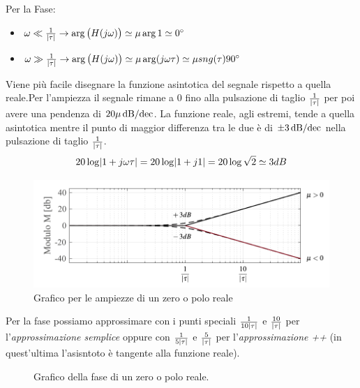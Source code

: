 Per la Fase:
\begin{itemize}
	\item $ \omega \ll \frac{1}{\abs{\tau}} \rightarrow \arg \big(H(j\omega)\big) \simeq \mu \arg 1 \simeq \ang{0} $ 
	\item $ \omega \gg \frac{1}{\abs{\tau}} \rightarrow \arg \big(H(j\omega)\big) \simeq \mu \arg (j\omega\tau) \simeq \mu \sng(\tau)\ang{90} $ 
\end{itemize}

Viene più facile disegnare la funzione asintotica del segnale rispetto a quella reale.Per l'ampiezza il segnale rimane a $ 0 $ fino alla pulsazione di taglio $ \frac{1}{\abs{\tau}} $ per poi avere una pendenza di $ 20 \mu \dbdec $. La funzione reale, agli estremi, tende a quella asintotica mentre il punto di maggior differenza tra le due è di $ \pm 3 \dbdec $ nella pulsazione di taglio $ \frac{1}{\abs{\tau}} $.
\[ 20\log \abs{1+j\omega\tau} = 20\log \abs{1+j1} = 20\log \sqrt{2} \simeq 3 dB \] 

\begin{figure}[H]
	\centering
	\includegraphics[width=0.7\linewidth]{immagini/cap6_Bode/bodeZPR-Amp.pdf}
	\caption{Grafico per le ampiezze di un zero o polo reale}
	\label{fig:bodezpr-amp}
\end{figure}

Per la fase possiamo approssimare con i punti speciali $ \frac{1}{10\abs{\tau}} $ e $ \frac{10}{\abs{\tau}} $ per l'\emph{approssimazione semplice} oppure con $ \frac{1}{5\abs{\tau}} $ e $ \frac{5}{\abs{\tau}} $ per l'\emph{approssimazione ++} (in quest'ultima l'asisntoto è tangente alla funzione reale).

\begin{figure}[H]
	\centering
	 \quad
	\caption{ Grafico della fase di un zero o polo reale. }
	\label{fig:bodezpr-fas}
\end{figure}


